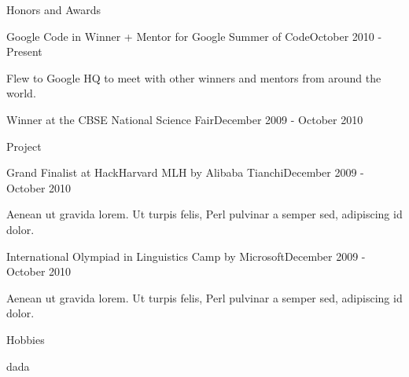 \documentclass[
	a4paper, %
	11pt, %
]{resume} %
\begin{document}
\begin{rSection}{Honors and Awards}

	\begin{achSubsection}{Google Code in Winner + Mentor for Google Summer of Code}{October 2010 - Present}
		\item Flew to Google HQ to meet with other winners and mentors from around the world.
	\end{achSubsection}


	\begin{achSubsection}{Winner at the CBSE National Science Fair}{December 2009 - October 2010}
		\item Project
	\end{achSubsection}


	\begin{achSubsection}{Grand Finalist at HackHarvard MLH by Alibaba Tianchi}{December 2009 - October 2010}
		\item Aenean ut gravida lorem. Ut turpis felis, Perl pulvinar a semper sed, adipiscing id dolor.
	\end{achSubsection}


	\begin{achSubsection}{International Olympiad in Linguistics Camp by Microsoft}{December 2009 - October 2010}
		\item Aenean ut gravida lorem. Ut turpis felis, Perl pulvinar a semper sed, adipiscing id dolor.
	\end{achSubsection}

\end{rSection}

\begin{rSection}{Hobbies}

	dada


\end{rSection}
\end{document}
